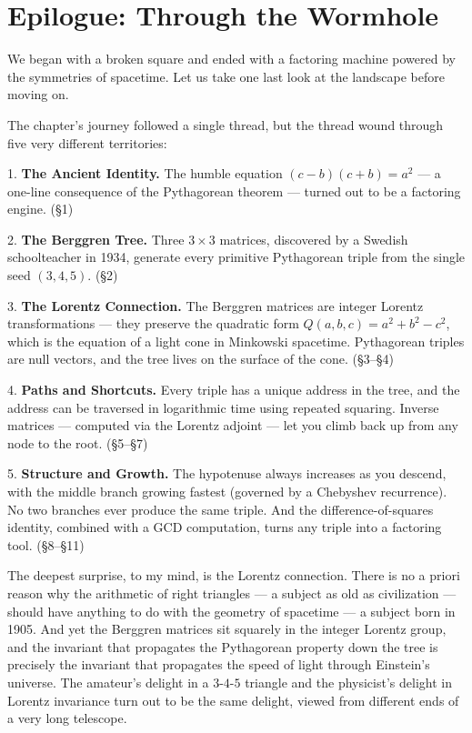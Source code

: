\bigskip

\section*{Epilogue: Through the Wormhole}

We began with a broken square and ended with a factoring machine powered by the symmetries of spacetime. Let us take one last look at the landscape before moving on.

The chapter's journey followed a single thread, but the thread wound through five very different territories:

1. \textbf{The Ancient Identity.} The humble equation $(c - b)(c + b) = a^2$ --- a one-line consequence of the Pythagorean theorem --- turned out to be a factoring engine. (§1)

2. \textbf{The Berggren Tree.} Three $3 \times 3$ matrices, discovered by a Swedish schoolteacher in 1934, generate every primitive Pythagorean triple from the single seed $(3, 4, 5)$. (§2)

3. \textbf{The Lorentz Connection.} The Berggren matrices are integer Lorentz transformations --- they preserve the quadratic form $Q(a, b, c) = a^2 + b^2 - c^2$, which is the equation of a light cone in Minkowski spacetime. Pythagorean triples are null vectors, and the tree lives on the surface of the cone. (§3--§4)

4. \textbf{Paths and Shortcuts.} Every triple has a unique address in the tree, and the address can be traversed in logarithmic time using repeated squaring. Inverse matrices --- computed via the Lorentz adjoint --- let you climb back up from any node to the root. (§5--§7)

5. \textbf{Structure and Growth.} The hypotenuse always increases as you descend, with the middle branch growing fastest (governed by a Chebyshev recurrence). No two branches ever produce the same triple. And the difference-of-squares identity, combined with a GCD computation, turns any triple into a factoring tool. (§8--§11)

The deepest surprise, to my mind, is the Lorentz connection. There is no a priori reason why the arithmetic of right triangles --- a subject as old as civilization --- should have anything to do with the geometry of spacetime --- a subject born in 1905. And yet the Berggren matrices sit squarely in the integer Lorentz group, and the invariant that propagates the Pythagorean property down the tree is precisely the invariant that propagates the speed of light through Einstein's universe. The amateur's delight in a $3$-$4$-$5$ triangle and the physicist's delight in Lorentz invariance turn out to be the same delight, viewed from different ends of a very long telescope.

